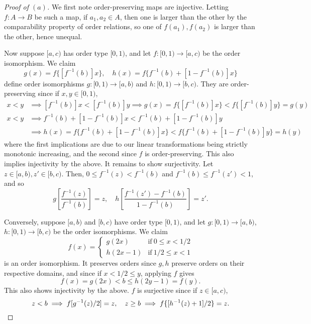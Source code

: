 \documentclass[12pt]{article}
\theoremstyle{remark}
\begin{document}
\begin{proof}[Proof of $(a)$]
  We first note order-preserving maps are injective. Letting $f\colon A \to B$ be such a map, if $a_1,a_2 \in A$, then one is larger than the other by the comparability property of order relations, so one of $f(a_1),f(a_2)$ is larger than the other, hence unequal.
  \par Now suppose $[a,c)$ has order type $[0,1)$, and let $f\colon [0,1) \to [a,c)$ be the order isomorphism. We claim
  \begin{equation*}
    g(x) = f\{[f^{-1}(b)] x\}, \quad h(x) = f\{f^{-1}(b) + [1-f^{-1}(b)]  x\}
  \end{equation*}
  define order isomorphisms $g\colon [0,1) \to [a,b)$ and $h\colon [0,1) \to [b,c)$. They are order-preserving since if $x,y \in [0,1)$,
  \begin{align*}
    x < y &\implies [f^{-1}(b)]x < [f^{-1}(b)]y \implies g(x) = f\{[f^{-1}(b)]x\} < f\{[f^{-1}(b)]y\} = g(y)\\
    x < y &\implies f^{-1}(b) + [1-f^{-1}(b)]  x < f^{-1}(b) + [1-f^{-1}(b)]  y\\
    &\implies h(x) = f\{f^{-1}(b) + [1-f^{-1}(b)]x\} < f\{f^{-1}(b) + [1-f^{-1}(b)]y\} = h(y)
  \end{align*}
  where the first implications are due to our linear transformations being strictly monotonic increasing, and the second since $f$ is order-preserving. This also implies injectivity by the above. It remains to show surjectivity. Let $z \in [a,b), z' \in [b,c)$. Then, $0 \le f^{-1}(z) < f^{-1}(b)$ and $f^{-1}(b) \le f^{-1}(z') < 1$, and so
  \begin{equation*}
    g\left[\frac{f^{-1}(z)}{f^{-1}(b)}\right] = z, \quad h\left[\frac{f^{-1}(z') - f^{-1}(b)}{1-f^{-1}(b)}\right] = z'.
  \end{equation*}
  \par Conversely, suppose $[a,b)$ and $[b,c)$ have order type $[0,1)$, and let
    $g\colon [0,1) \to [a,b)$, $h\colon [0,1) \to [b,c)$ be the order isomorphisms. We claim
  \begin{equation*}
    f(x) = \begin{cases}
      g(2x) & \text{if}~0 \le x < 1/2\\
      h(2x-1) & \text{if}~1/2 \le x < 1
    \end{cases}
  \end{equation*}
  is an order isomorphism. It preserves orders since $g,h$ preserve orders on their respective domains, and since if $x < 1/2 \le y$, applying $f$ gives
  \begin{equation*}
    f(x) = g(2x) < b \le h(2y-1) = f(y).
  \end{equation*}
  This also shows injectivity by the above. $f$ is surjective since if $z \in [a,c)$,
  \begin{equation*}
    z < b \implies f[g^{-1}(z)/2] = z, \quad z \ge b \implies f\{[h^{-1}(z)+1]/2\} = z.\qedhere
  \end{equation*}
\end{proof}
\end{document}
